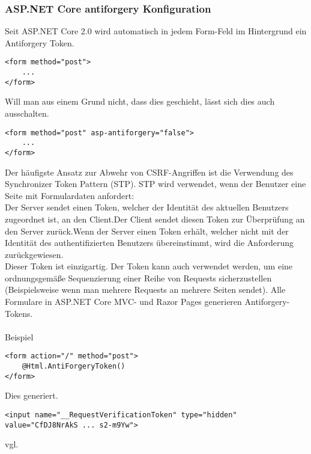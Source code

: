 {\subsubsection{ASP.NET Core antiforgery Konfiguration}
Seit ASP.NET Core 2.0 wird automatisch in jedem Form-Feld im Hintergrund ein Antiforgery Token.
\begin{lstlisting}
<form method="post">
    ...
</form>
\end{lstlisting}
Will man aus einem Grund nicht, dass dies geschieht, lässt sich dies auch ausschalten.
\begin{lstlisting}
<form method="post" asp-antiforgery="false">
    ...
</form>
\end{lstlisting}
Der häufigste Ansatz zur Abwehr von CSRF-Angriffen ist die Verwendung des Synchronizer Token Pattern (STP). STP wird verwendet, wenn der Benutzer eine Seite mit Formulardaten anfordert:\\Der Server sendet einen Token, welcher der Identität des aktuellen Benutzers zugeordnet ist, an den Client.Der Client sendet diesen Token zur Überprüfung an den Server zurück.Wenn der Server einen Token erhält, welcher nicht mit der Identität des authentifizierten Benutzers übereinstimmt, wird die Anforderung zurückgewiesen.\\Dieser Token ist einzigartig. Der Token kann auch verwendet werden, um eine ordnungsgemäße Sequenzierung einer Reihe von Requests sicherzustellen (Beispielsweise wenn man mehrere Requests an mehrere Seiten sendet). Alle Formulare in ASP.NET Core MVC- und Razor Pages generieren Antiforgery-Tokens.\\ \\Beispiel\\
\begin{lstlisting}
<form action="/" method="post">
    @Html.AntiForgeryToken()
</form>
\end{lstlisting}
Dies generiert.\\
\begin{lstlisting}
<input name="__RequestVerificationToken" type="hidden" value="CfDJ8NrAkS ... s2-m9Yw">
\end{lstlisting}
vgl. \textcite{CSRF-Protection}
}
